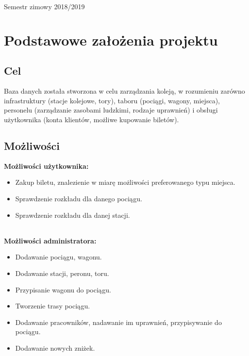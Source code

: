\begin{titlepage}


{\large Semestr zimowy 2018/2019}\\ %



\vfill %

\end{titlepage}


\section{Podstawowe założenia projektu}

\subsection{Cel}
Baza danych została stworzona w celu zarządzania koleją, w rozumieniu zarówno infrastruktury (stacje kolejowe, tory), taboru (pociągi, wagony, miejsca), personelu (zarządzanie zasobami ludzkimi, rodzaje uprawnień) i obsługi użytkownika (konta klientów, możliwe kupowanie biletów).

\subsection{Możliwości}
\textbf{Możliwości użytkownika:}
\begin{itemize}
    \item Zakup biletu, znalezienie w miarę możliwości preferowanego typu miejsca.
    \item Sprawdzenie rozkładu dla danego pociągu.
    \item Sprawdzenie rozkładu dla danej stacji.
\end{itemize}
\hfill \\
\textbf{Możliwości administratora:}
\begin{itemize}
    \item Dodawanie pociągu, wagonu.
    \item Dodawanie stacji, peronu, toru.
    \item Przypisanie wagonu do pociągu.
    \item Tworzenie trasy pociągu.
    \item Dodawanie pracowników, nadawanie im uprawnień, przypisywanie do pociągu.
    \item Dodawanie nowych zniżek.
\end{itemize}

